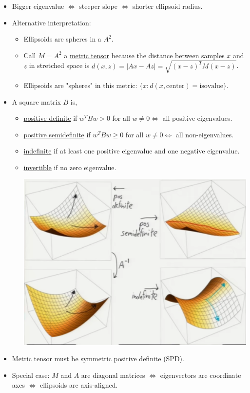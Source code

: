 \documentclass[10pt]{article}
\begin{document}
\begin{itemize}
\begin{itemize}
				\end{itemize}
			\item Bigger eigenvalue $\Leftrightarrow$ steeper slope $\Leftrightarrow$ shorter ellipsoid radius.
			\item Alternative interpretation:
				\begin{itemize}
					\item Ellipsoids are spheres in a  $A^{2}$.
					\item Call $M = A^{2}$ a \underline{metric tensor} because the distance between samples $x$ and $z$ in stretched space is $d(x, z) = |Ax - Az| = \sqrt{(x-z)^{T}M(x-z)}$.
					\item Ellipsoids are "spheres" in this metric: $\{x: d(x, \text{center}) = \text{isovalue}\}$.
				\end{itemize}
			\item A square matrix $B$ is,
				\begin{itemize}
					\item \underline{positive definite} if $w^{T}Bw > 0$ for all $w \neq 0 \Leftrightarrow$ all positive eigenvalues.
					\item \underline{positive semidefinite} if $w^{T}Bw \geq 0$ for all $w \neq 0 \Leftrightarrow$ all non-eigenvalues.
					\item \underline{indefinite} if at least one positive eigenvalue and one negative eigenvalue.
					\item \underline{invertible} if no zero eigenvalue.
					\begin{center}
						\includegraphics[scale=0.5]{../images/matrices}
					\end{center}
				\end{itemize}
			\item Metric tensor must be symmetric positive definite (SPD).
			\item Special case: $M$ and $A$ are diagonal matrices $\Leftrightarrow$ eigenvectors are coordinate axes $\Leftrightarrow$ ellipsoids are axis-aligned.
		\end{itemize} 
	
\end{document}
